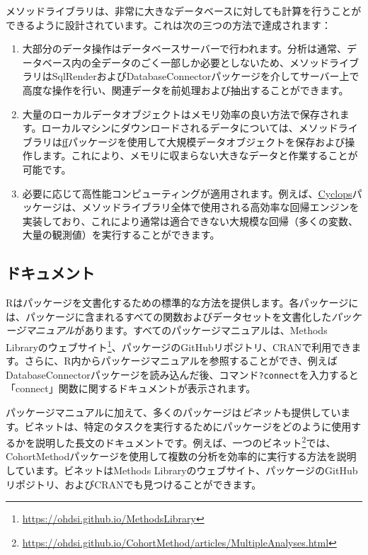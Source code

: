 \documentclass[
  11pt]{book}
\providecommand{\tightlist}{%
  \setlength{\itemsep}{0pt}\setlength{\parskip}{0pt}}
\theoremstyle{definition}
\theoremstyle{definition}
\theoremstyle{definition}
\theoremstyle{definition}
\theoremstyle{remark}
\begin{document}
メソッドライブラリは、非常に大きなデータベースに対しても計算を行うことができるように設計されています。これは次の三つの方法で達成されます：

\begin{enumerate}
\def\labelenumi{\arabic{enumi}.}
\tightlist
\item
  大部分のデータ操作はデータベースサーバーで行われます。分析は通常、データベース内の全データのごく一部しか必要としないため、メソッドライブラリはSqlRenderおよびDatabaseConnectorパッケージを介してサーバー上で高度な操作を行い、関連データを前処理および抽出することができます。
\item
  大量のローカルデータオブジェクトはメモリ効率の良い方法で保存されます。ローカルマシンにダウンロードされるデータについては、メソッドライブラリは\href{https://cran.r-project.org/web/packages/ff}{ff}パッケージを使用して大規模データオブジェクトを保存および操作します。これにより、メモリに収まらない大きなデータと作業することが可能です。
\item
  必要に応じて高性能コンピューティングが適用されます。例えば、\href{https://ohdsi.github.io/Cyclops/}{Cyclops}パッケージは、メソッドライブラリ全体で使用される高効率な回帰エンジンを実装しており、これにより通常は適合できない大規模な回帰（多くの変数、大量の観測値）を実行することができます。
\end{enumerate}

\subsection{ドキュメント}\label{ux30c9ux30adux30e5ux30e1ux30f3ux30c8-1}

Rはパッケージを文書化するための標準的な方法を提供します。各パッケージには、パッケージに含まれるすべての関数およびデータセットを文書化した\emph{パッケージマニュアル}があります。すべてのパッケージマニュアルは、Methods Libraryのウェブサイト\footnote{\url{https://ohdsi.github.io/MethodsLibrary}}、パッケージのGitHubリポジトリ、CRANで利用できます。さらに、R内からパッケージマニュアルを参照することができ、例えばDatabaseConnectorパッケージを読み込んだ後、コマンド\texttt{?connect}を入力すると「connect」関数に関するドキュメントが表示されます。

パッケージマニュアルに加えて、多くのパッケージは\emph{ビネット}も提供しています。ビネットは、特定のタスクを実行するためにパッケージをどのように使用するかを説明した長文のドキュメントです。例えば、一つのビネット\footnote{\url{https://ohdsi.github.io/CohortMethod/articles/MultipleAnalyses.html}}では、CohortMethodパッケージを使用して複数の分析を効率的に実行する方法を説明しています。ビネットはMethods Libraryのウェブサイト、パッケージのGitHubリポジトリ、およびCRANでも見つけることができます。 
\end{document}
